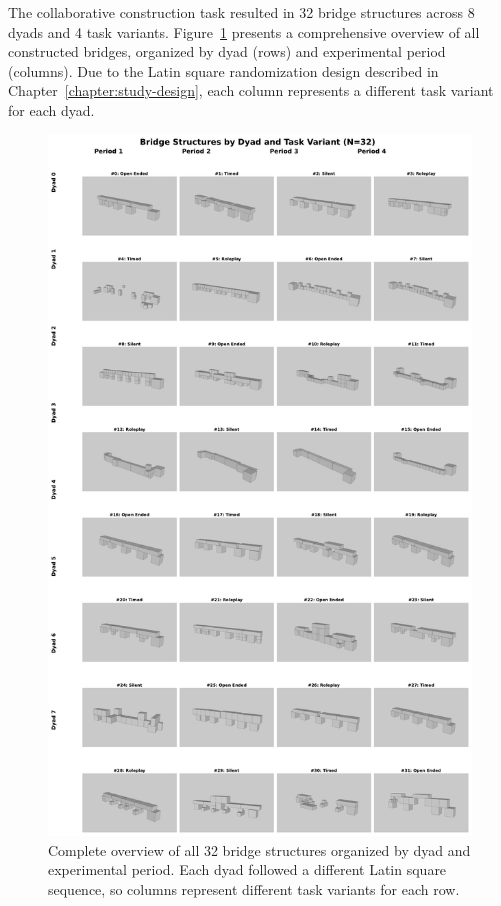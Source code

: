 The collaborative construction task resulted in 32 bridge structures across 8 dyads and 4 task variants. Figure~\ref{fig:bridge_structures_grid} presents a comprehensive overview of all constructed bridges, organized by dyad (rows) and experimental period (columns). Due to the Latin square randomization design described in Chapter~\ref{chapter:study-design}, each column represents a different task variant for each dyad.

\begin{figure}[H]
\centering
\includegraphics[width=\textwidth]{assets/06/bridge_structures_grid.pdf}
\caption{Complete overview of all 32 bridge structures organized by dyad and experimental period. Each dyad followed a different Latin square sequence, so columns represent different task variants for each row.}
\label{fig:bridge_structures_grid}
\end{figure}


